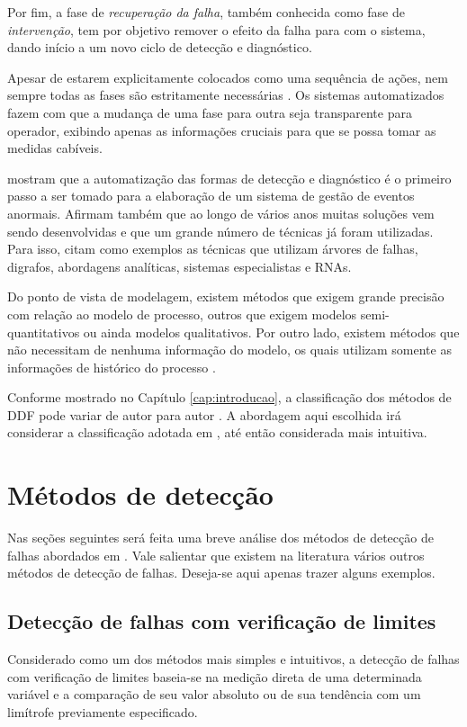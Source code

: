 Por fim, a fase de {\it recuperação da falha}, também conhecida como fase de
{\it intervenção}, tem por objetivo remover o efeito da falha para com o
sistema, dando início a um novo ciclo de detecção e diagnóstico.

Apesar de estarem explicitamente colocados como uma sequência de ações, nem
sempre todas as fases são estritamente necessárias \cite{chiang:2001}. Os
sistemas automatizados fazem com que a mudança de uma fase para outra seja
transparente para operador, exibindo apenas as informações cruciais para que se
possa tomar as medidas cabíveis.

 mostram que a automatização das formas de detecção
e diagnóstico é o primeiro passo a ser tomado para a elaboração de um sistema de
gestão de eventos anormais. Afirmam também que ao longo de vários anos muitas
soluções vem sendo desenvolvidas e que um grande número de técnicas já foram
utilizadas. Para isso, citam como exemplos as técnicas que utilizam árvores de
falhas, digrafos, abordagens analíticas, sistemas especialistas e RNAs.

\fussy
Do ponto de vista de modelagem, existem métodos que exigem grande precisão com
relação ao modelo de processo, outros que exigem modelos semi-quantitativos ou
ainda modelos qualitativos. Por outro lado, existem métodos que não necessitam
de nenhuma informação do modelo, os quais utilizam somente as informações de
histórico do processo \cite{venkatasu:2003a}.
\sloppy

Conforme mostrado no Capítulo \ref{cap:introducao}, a classificação dos métodos
de DDF pode variar de autor para autor
\cite{venkatasu:2003a,angeli:2004,zhang:2008,isermann:2006}. A abordagem aqui
escolhida irá considerar a classificação adotada em ,
até então considerada mais intuitiva.

\section{Métodos de detecção}
Nas seções seguintes será feita uma breve análise dos métodos de detecção de
falhas abordados em . Vale salientar que existem na
literatura vários outros métodos de detecção de falhas. Deseja-se aqui apenas
trazer alguns exemplos.

\subsection{Detecção de falhas com verificação de limites}
Considerado como um dos métodos mais simples e intuitivos, a detecção de falhas
com verificação de limites baseia-se na medição direta de uma determinada
variável e a comparação de seu valor absoluto ou de sua tendência com um
limítrofe previamente especificado.

